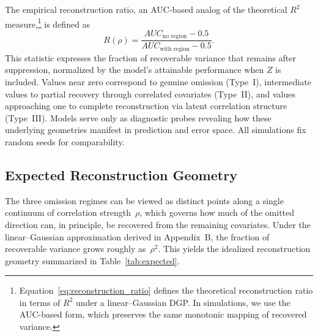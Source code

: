 \documentclass[11pt]{article}
\begin{document}
The empirical reconstruction ratio, an AUC-based analog of the theoretical $R^2$ measure,\footnote{Equation~\ref{eq:reconstruction_ratio} defines the theoretical reconstruction ratio in terms of $R^2$ under a linear–Gaussian DGP.  
In simulations, we use the AUC-based form, which preserves the same monotonic mapping of recovered variance.}
is defined as
\[
R(\rho)
  = \frac{AUC_{\text{no region}} - 0.5}
          {AUC_{\text{with region}} - 0.5}.
\]
This statistic expresses the fraction of recoverable variance that remains after suppression, normalized by the model’s attainable performance when $Z$ is included.  
Values near zero correspond to genuine omission (Type~I), intermediate values to partial recovery through correlated covariates (Type~II), and values approaching one to complete reconstruction via latent correlation structure (Type~III).  
Models serve only as diagnostic probes revealing how these underlying geometries manifest in prediction and error space. All simulations fix random seeds for comparability.  

\subsection{Expected Reconstruction Geometry}

The three omission regimes can be viewed as distinct points along a single
continuum of correlation strength~$\rho$, which governs how much of the omitted
direction can, in principle, be recovered from the remaining covariates.  
Under the linear–Gaussian approximation derived in Appendix~B, the fraction of
recoverable variance grows roughly as~$\rho^2$.  
This yields the idealized reconstruction geometry summarized in
Table~\ref{tab:expected}.

\begin{table}[H]
\centering
\caption{\textbf{Expected recovery by omission regime (theoretical).}}
\label{tab:expected}
\end{table}
\end{document}

